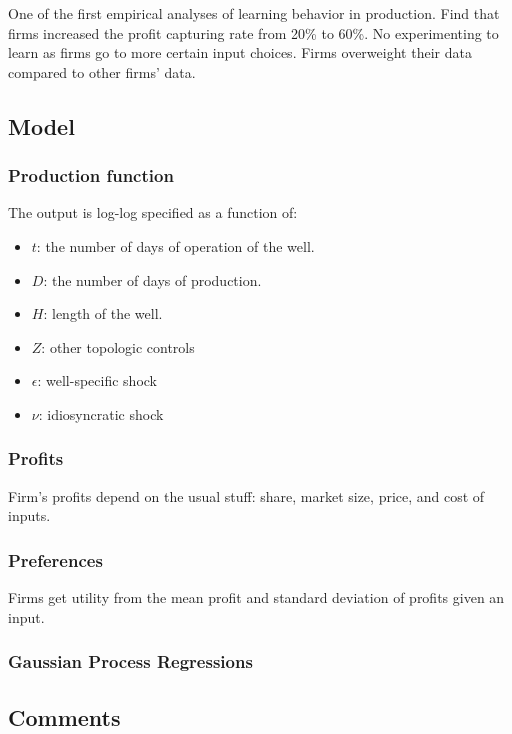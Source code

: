 One of the first empirical analyses of learning behavior in production. Find that firms increased the profit capturing rate from 20\% to 60\%. No experimenting to learn as firms go to more certain input choices. Firms overweight their data compared to other firms' data.

\subsection{Model}

\subsubsection{Production function}

The output is log-log specified as a function of:\begin{itemize}
\item $t$: the number of days of operation of the well.
\item $D$: the number of days of production.
\item $H$: length of the well.
\item $Z$: other topologic controls
\item $\epsilon$: well-specific shock
\item $\nu$: idiosyncratic shock
\end{itemize}

\subsubsection{Profits}

Firm's profits depend on the usual stuff: share, market size, price, and cost of inputs.

\subsubsection{Preferences}

Firms get utility from the mean profit and standard deviation of profits given an input.

\subsubsection{Gaussian Process Regressions}



\subsection{Comments}

